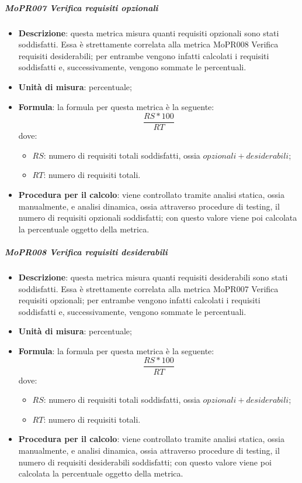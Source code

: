 \documentclass[../norme-di-progetto.tex]{subfiles}
\begin{document}
\subparagraph{MoPR007 Verifica requisiti opzionali}
\begin{itemize}
  \item \textbf{Descrizione}: questa metrica misura quanti requisiti opzionali sono stati soddisfatti. Essa è strettamente correlata alla metrica MoPR008 Verifica requisiti desiderabili; per entrambe vengono infatti calcolati i requisiti soddisfatti e, successivamente, vengono sommate le percentuali.
  \item \textbf{Unità di misura}: percentuale;
  \item \textbf{Formula}: la formula per questa metrica è la seguente:
  \begin{displaymath}
    \frac{RS * 100}{RT}
  \end{displaymath}
  dove:
  \begin{itemize}
    \item $ RS $: numero di requisiti totali soddisfatti, ossia $ opzionali + desiderabili $;
    \item $ RT $: numero di requisiti totali.
  \end{itemize}
    \item \textbf{Procedura per il calcolo}: viene controllato tramite analisi statica, ossia manualmente, e analisi dinamica, ossia attraverso procedure di testing, il numero di requisiti opzionali soddisfatti; con questo valore viene poi calcolata la percentuale oggetto della metrica.
\end{itemize}

\subparagraph{MoPR008 Verifica requisiti desiderabili}
\begin{itemize}
  \item \textbf{Descrizione}: questa metrica misura quanti requisiti desiderabili sono stati soddisfatti. Essa è strettamente correlata alla metrica MoPR007 Verifica requisiti opzionali; per entrambe vengono infatti calcolati i requisiti soddisfatti e, successivamente, vengono sommate le percentuali.
  \item \textbf{Unità di misura}: percentuale;
  \item \textbf{Formula}: la formula per questa metrica è la seguente:
  \begin{displaymath}
    \frac{RS * 100}{RT}
  \end{displaymath}
  dove:
  \begin{itemize}
    \item $ RS $: numero di requisiti totali soddisfatti, ossia $ opzionali + desiderabili $;
    \item $ RT $: numero di requisiti totali.
  \end{itemize}
    \item \textbf{Procedura per il calcolo}: viene controllato tramite analisi statica, ossia manualmente, e analisi dinamica, ossia attraverso procedure di testing, il numero di requisiti desiderabili soddisfatti; con questo valore viene poi calcolata la percentuale oggetto della metrica.
\end{itemize}
\end{document}
